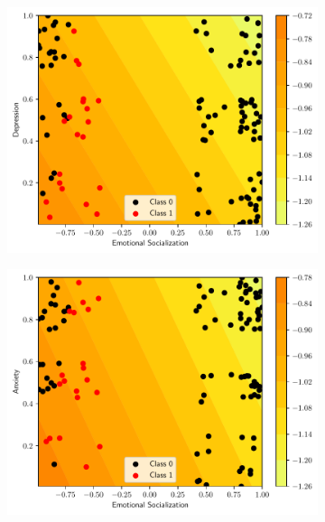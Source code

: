 \documentclass[conference]{IEEEtran}
\theoremstyle{definition}
\theoremstyle{remark}
\theoremstyle{remark}
\begin{document}
\begin{figure}
    \begin{subfigure}[b]{0.32\textwidth}
        \centering
        \includegraphics[width=\textwidth]{figs/svm-linear-contour-2-3.pdf}
        \caption{}
    \end{subfigure}
    \begin{subfigure}[b]{0.32\textwidth}
        \centering
        \includegraphics[width=\textwidth]{figs/svm-linear-contour-2-4.pdf}
        \caption{}
    \end{subfigure}
    \begin{subfigure}[b]{0.32\textwidth}
        \centering

\end{subfigure}
\end{figure}
\end{document}
